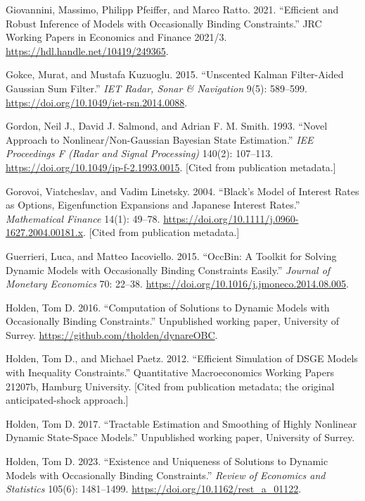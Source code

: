 \documentclass[11pt]{article}
\begin{document}
\begin{list}{}{\setlength{\leftmargin}{2em}\setlength{\itemindent}{-2em}\setlength{\itemsep}{2pt}\setlength{\parsep}{0pt}}
\item Giovannini, Massimo, Philipp Pfeiffer, and Marco Ratto. 2021. ``Efficient and Robust Inference of Models with Occasionally Binding Constraints.'' JRC Working Papers in Economics and Finance 2021/3. \url{https://hdl.handle.net/10419/249365}.

\item Gokce, Murat, and Mustafa Kuzuoglu. 2015. ``Unscented Kalman Filter-Aided Gaussian Sum Filter.'' \emph{IET Radar, Sonar \& Navigation} 9(5): 589--599. \url{https://doi.org/10.1049/iet-rsn.2014.0088}.

\item Gordon, Neil J., David J. Salmond, and Adrian F. M. Smith. 1993. ``Novel Approach to Nonlinear/Non-Gaussian Bayesian State Estimation.'' \emph{IEE Proceedings F (Radar and Signal Processing)} 140(2): 107--113. \url{https://doi.org/10.1049/ip-f-2.1993.0015}. [Cited from publication metadata.]

\item Gorovoi, Viatcheslav, and Vadim Linetsky. 2004. ``Black's Model of Interest Rates as Options, Eigenfunction Expansions and Japanese Interest Rates.'' \emph{Mathematical Finance} 14(1): 49--78. \url{https://doi.org/10.1111/j.0960-1627.2004.00181.x}. [Cited from publication metadata.]

\item Guerrieri, Luca, and Matteo Iacoviello. 2015. ``OccBin: A Toolkit for Solving Dynamic Models with Occasionally Binding Constraints Easily.'' \emph{Journal of Monetary Economics} 70: 22--38. \url{https://doi.org/10.1016/j.jmoneco.2014.08.005}.

\item Holden, Tom D. 2016. ``Computation of Solutions to Dynamic Models with Occasionally Binding Constraints.'' Unpublished working paper, University of Surrey. \url{https://github.com/tholden/dynareOBC}.

\item Holden, Tom D., and Michael Paetz. 2012. ``Efficient Simulation of DSGE Models with Inequality Constraints.'' Quantitative Macroeconomics Working Papers 21207b, Hamburg University. [Cited from publication metadata; the original anticipated-shock approach.]

\item Holden, Tom D. 2017. ``Tractable Estimation and Smoothing of Highly Nonlinear Dynamic State-Space Models.'' Unpublished working paper, University of Surrey.

\item Holden, Tom D. 2023. ``Existence and Uniqueness of Solutions to Dynamic Models with Occasionally Binding Constraints.'' \emph{Review of Economics and Statistics} 105(6): 1481--1499. \url{https://doi.org/10.1162/rest_a_01122}.


\end{list}
\end{document}
